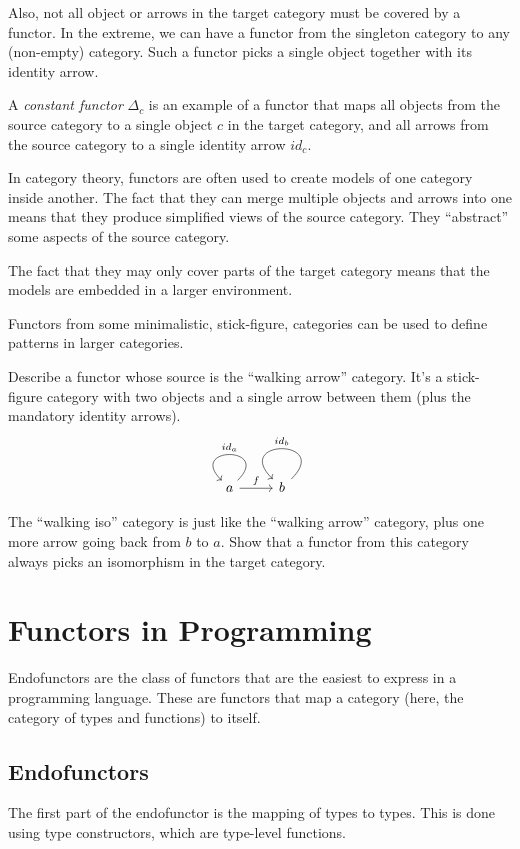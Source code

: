 \documentclass[DaoFP]{subfiles}
\begin{document}
Also, not all object or arrows in the target category must be covered by a functor. In the extreme, we can have a functor from the singleton category to any (non-empty) category. Such a functor picks a single object together with its identity arrow.

A \emph{constant functor} $\Delta_c$ is an example of a functor that maps all objects from the source category to a single object $c$ in the target category, and all arrows from the source category to a single identity arrow $id_c$.

In category theory, functors are often used to create models of one category inside another. The fact that they can merge multiple objects and arrows into one means that they produce simplified views of the source category. They ``abstract'' some aspects of the source category.

The fact that they may only cover parts of the target category means that the models are embedded in a larger environment.

Functors from some minimalistic, stick-figure, categories can be used to define patterns in larger categories.

\begin{exercise}
Describe a functor whose source is the ``walking arrow'' category. It's a stick-figure category with two objects and a single arrow between them (plus the mandatory identity arrows).
\[
 \begin{tikzcd}
 a 
  \arrow[loop,  "id_{a}"']
\arrow[r, "f"]
 & b
  \arrow[loop, "id_{b}"']
  \end{tikzcd}
\]
\end{exercise}
\begin{exercise}
The ``walking iso'' category is just like the ``walking arrow'' category, plus one more arrow going back from $b$ to $a$. Show that a functor from this category always picks an isomorphism in the target category. 
\end{exercise}

\section{Functors in Programming}

Endofunctors are the class of functors that are the easiest to express in a programming language. These are functors that map a category (here, the category of types and functions) to itself. 

\subsection{Endofunctors}
The first part of the endofunctor is the mapping of types to types. This is done using type constructors, which are type-level functions. 
\end{document}

